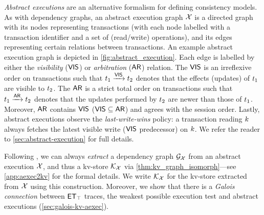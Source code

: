 \emph{Abstract executions} \cite{ev_transactions,framework-concur} are an alternative formalism for defining consistency models. 
As with dependency graphs, an abstract execution graph $\mathcal{X}$
is a directed graph with its nodes representing transactions (with each node labelled with a transaction identifier and a set of (read/write) operations), 
and its edges representing certain relations between transactions. 
An example abstract execution graph is depicted in \cref{fig:abstract_execution}. 
Each edge is labelled by either the \emph{visibility} ($\mathsf{VIS}$) or \emph{arbitration} ($\mathsf{AR}$) relation. 
The $\mathsf{VIS}$ is an irreflexive order on transactions such that $t_1 \xrightarrow{\mathsf{VIS}} t_2$ denotes that the effects (updates) of $t_1$ are visible to $t_2$. 
The $\mathsf{AR}$ is a strict total order on transactions such that $t_1 \xrightarrow{\mathsf{AR}} t_2$ denotes that the updates performed by $t_2$ are newer than those of $t_1$. 
Moreover, $\mathsf{AR}$ contains $\mathsf{VIS}$ ($\mathsf{VIS} \subseteq \mathsf{AR}$) and agrees with the session order.
Lastly, abstract executions observe the \emph{last-write-wins} policy: 
a transaction reading $k$ always fetches the latest visible write ($\mathsf{VIS}$ predecessor) on $k$.
We refer the reader to \cref{sec:abstract-execution} for full details.

Following \cite{laws}, we can always \emph{extract} a dependency graph $\mathcal{G}_{\mathcal{X}}$ from an abstract execution $\mathcal{X}$, and thus a kv-store $\mathcal{K}_{\mathcal{X}}$ via \cref{thm:kv_graph_isomorph}---see \cref{app:aexec2kv} for the formal details.
We write  $\mathcal{K}_{\mathcal{X}}$ for the kv-store extracted from $\mathcal{X}$ using this construction.  
Moreover, we show that there is a \emph{Galois connection}
between $\mathsf{ET}_{\top}$ traces, the weakest possible execution test and abstract executions (\cref{sec:galois-kv-aexec}).

